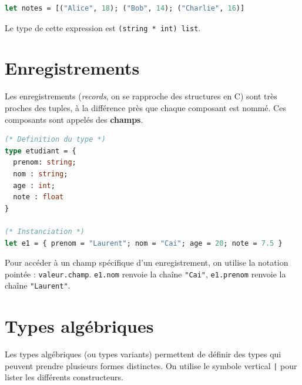 \documentclass{article}
\begin{document}
\begin{lstlisting}[language=Caml]
let notes = [("Alice", 18); ("Bob", 14); ("Charlie", 16)]
\end{lstlisting}
\noindent Le type de cette expression est \texttt{(string * int) list}.


\section{Enregistrements}

Les enregistrements (\textit{records}, on se rapproche des structures en C) sont très proches des tuples, à la différence près que chaque composant est nommé. Ces composants sont appelés des \textbf{champs}.


\begin{lstlisting}[language=Caml]
(* Definition du type *)
type etudiant = {
  prenom: string;
  nom : string;
  age : int;
  note : float
}

(* Instanciation *)
let e1 = { prenom = "Laurent"; nom = "Cai"; age = 20; note = 7.5 }
\end{lstlisting}

\vspace{0.5em}

\noindent Pour accéder à un champ spécifique d'un enregistrement, on utilise la notation pointée : \texttt{valeur.champ}.
\texttt{e1.nom} renvoie la chaîne \texttt{"Cai"}, \texttt{e1.prenom} renvoie la chaîne \texttt{"Laurent"}.

\section{Types algébriques}

Les types algébriques (ou types variants) permettent de définir des types qui peuvent prendre plusieurs formes distinctes. On utilise le symbole vertical \texttt{|} pour lister les différents constructeurs.
\end{document}
